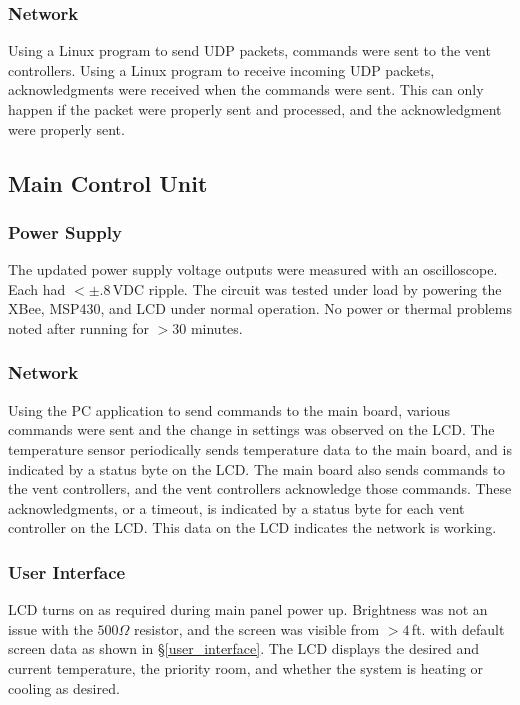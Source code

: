 \subsubsection{Network}
Using a Linux program to send UDP packets, commands were sent to the vent controllers.  Using a Linux program to receive incoming UDP packets, acknowledgments were received when the commands were sent.  This can only happen if the packet were properly sent and processed, and the acknowledgment were properly sent.

\subsection{Main Control Unit}

\subsubsection{Power Supply}
The updated power supply voltage outputs were measured with an oscilloscope.  Each had $<\pm .8$\,VDC ripple.  The circuit was tested under load by powering the XBee, MSP430, and LCD under normal operation. No power or thermal problems noted after running for $>30$ minutes.

\subsubsection{Network}
Using the PC application to send commands to the main board, various commands were sent and the change in settings was observed on the LCD.  The temperature sensor periodically sends temperature data to the main board, and is indicated by a status byte on the LCD.  The main board also sends commands to the vent controllers, and the vent controllers acknowledge those commands.  These acknowledgments, or a timeout, is indicated by a status byte for each vent controller on the LCD.  This data on the LCD indicates the network is working. 

\subsubsection{User Interface}
LCD turns on as required during main panel power up.  Brightness was not an issue with the $500\Omega$ resistor, and the screen was visible from $>4$\,ft. with default screen data as shown in \S\ref{user_interface}.  The LCD displays the desired and current temperature, the priority room, and whether the system is heating or cooling as desired.

